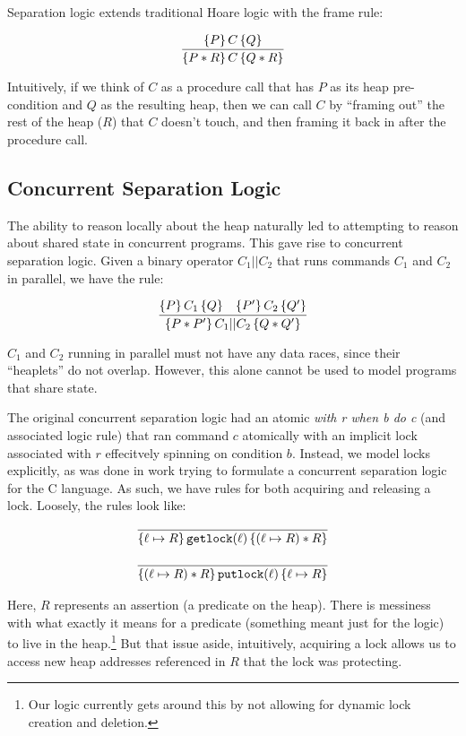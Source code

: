 Separation logic extends traditional Hoare logic\cite{hoare1969axiomatic} with
the frame rule:

\[
\infer{\hoaretrip{P * R}{C}{Q * R}}{\hoaretrip{P}{C}{Q}}
\]

Intuitively, if we think of $C$ as a procedure call that has $P$ as its heap
pre-condition and $Q$ as the resulting heap, then we can call $C$ by ``framing
out'' the rest of the heap ($R$) that $C$ doesn't touch, and then framing it
back in after the procedure call.

\subsection{Concurrent Separation Logic}

The ability to reason locally about the heap naturally led to attempting to
reason about shared state in concurrent programs. This gave rise to concurrent
separation logic\cite{o2007resources}. Given a binary operator $C_1 || C_2$ that
runs commands $C_1$ and $C_2$ in parallel, we have the rule:

\[
    \infer{\hoaretrip{P * P'}{C_1 || C_2}{Q * Q'}}{\hoaretrip{P}{C_1}{Q} &
						   \hoaretrip{P'}{C_2}{Q'}}
\]

$C_1$ and $C_2$ running in parallel must not have any data races, since their
``heaplets'' do not overlap. However, this alone cannot be used to model
programs that share state.

The original concurrent separation logic had an atomic \textit{with r when b do
c} (and associated logic rule) that ran command $c$ atomically with an implicit
lock associated with $r$ effecitvely spinning on condition $b$. Instead, we
model locks explicitly, as was done in work trying to formulate a concurrent
separation logic for the C language.\cite{hobor2008oracle} As such, we have
rules for both acquiring and releasing a lock. Loosely, the rules look like:

\begin{align*}
    \infer{\hoaretrip{\ell \mapsto R}{\texttt{getlock}(\ell)}{(\ell \mapsto R) *
    R}}{} \\[+9px]
    \infer{\hoaretrip{(\ell \mapsto R) * R}{\texttt{putlock}(\ell)}{\ell \mapsto R}}{}
\end{align*}

Here, $R$ represents an assertion (a predicate on the heap). There is messiness
with what exactly it means for a predicate (something meant just for the logic)
to live in the heap.\footnote{Our logic currently gets around this by not allowing for
dynamic lock creation and deletion.} But that issue aside, intuitively,
acquiring a lock allows us to access new heap addresses referenced in $R$ that the
lock was protecting.

